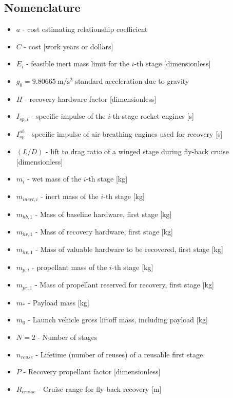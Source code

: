 \documentclass[conf]{new-aiaa}
\begin{document}
\begin{multicols}{2}

\section*{Nomenclature}
\begin{itemize}
    \item $a$ - cost estimating relationship coefficient
    \item $C$ - cost [work years or dollars]
    \item $E_i$ - feasible inert mass limit for the $i$-th stage [dimensionless]
    \item $g_0 = \SI{9.80665}{\meter\per\second\squared}$ standard acceleration due to gravity
    \item $H$ - recovery hardware factor [dimensionless]
    \item $I_{sp,i}$ - specific impulse of the $i$-th stage rocket engines [\si{\second}]
    \item $I_{sp}^{ab}$ - specific impulse of air-breathing engines used for recovery [\si{\second}]
    \item $(L/D)$ - lift to drag ratio of a winged stage during fly-back cruise [dimensionless]
    \item $m_i$ - wet mass of the $i$-th stage [\si{kg}]
    \item $m_{inert,i}$ - inert mass of the $i$-th stage [\si{kg}]
    \item $m_{hb,1}$ - Mass of baseline hardware, first stage [\si{kg}]
    \item $m_{hr,1}$ - Mass of recovery hardware, first stage [\si{kg}]
    \item $m_{hv,1}$ - Mass of valuable hardware to be recovered, first stage [\si{kg}]
    \item $m_{p,i}$ - propellant mass of the $i$-th stage [\si{kg}]
    \item $m_{pr,1}$ - Mass of propellant reserved for recovery, first stage [\si{kg}]
    \item $m_*$ - Payload mass [\si{kg}]
    \item $m_0$ - Launch vehicle gross liftoff mass, including payload [\si{kg}]
    \item $N = 2$ - Number of stages
    \item $n_{reuse}$ - Lifetime (number of reuses) of a reusable first stage
    \item $P$ - Recovery propellant factor [dimensionless]
    \item $R_{cruise}$ - Cruise range for fly-back recovery [\si{\meter}]

\end{itemize}
\end{multicols}
\end{document}
